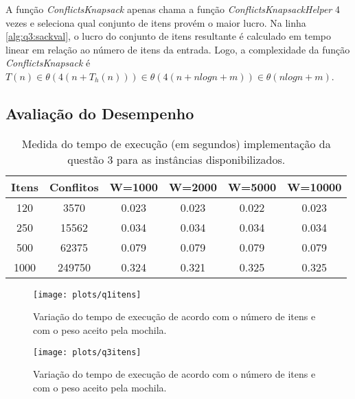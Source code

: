\documentclass[a4paper]{article}
\begin{document}
A função \emph{ConflictsKnapsack} apenas chama a função \emph{ConflictsKnapsackHelper} 4 vezes e seleciona qual conjunto de itens provém o maior lucro. Na linha \ref{alg:q3:sackval}, o lucro do conjunto de itens resultante é calculado em tempo linear em relação ao número de itens da entrada. Logo, a complexidade da função \emph{ConflictsKnapsack} é $T(n) \in \theta(4(n + T_h(n))) \in \theta(4(n + nlogn + m)) \in \theta(nlogn + m)$.

\subsection{Avaliação do Desempenho}

\begin{table}[H]
\centering
\begin{tabular}{c|c|c|c|c|c}
Itens & Conflitos & W=1000 & W=2000 & W=5000 & W=10000 \\
\hline
120 & 3570 & 0.023	& 0.023	& 0.022	& 0.023	\\
250 & 15562 & 0.034	& 0.034	& 0.034	& 0.034	\\
500 & 62375 & 0.079	& 0.079	& 0.079	& 0.079	\\
1000 & 249750 & 0.324	& 0.321	& 0.325	& 0.325	\\
\end{tabular}
\caption{Medida do tempo de execução (em segundos) implementação da questão 3 para as instâncias disponibilizados.}
\label{tab:q3:bench}
\end{table}

\begin{figure}[H]
\centering
\texttt{[image: plots/q1itens]}
\caption{Variação do tempo de execução de acordo com o número de itens e com o peso aceito pela mochila.}
\label{fig:q1:itens}
\end{figure}

\begin{figure}[H]
\centering
\texttt{[image: plots/q3itens]}
\caption{Variação do tempo de execução de acordo com o número de itens e com o peso aceito pela mochila.}
\label{fig:q3:itens}
\end{figure}
\end{document}
